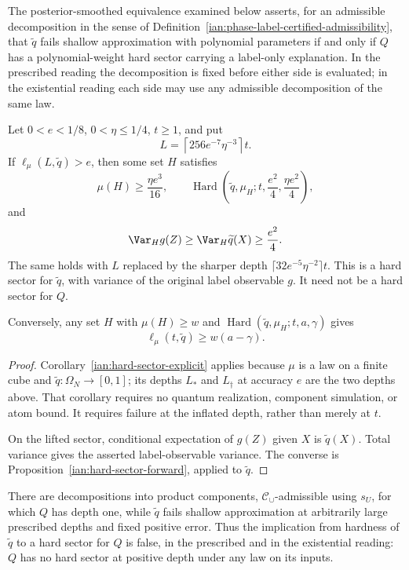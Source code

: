 The posterior-smoothed equivalence examined below asserts, for an admissible decomposition in the sense of Definition~\ref{ian:phase-label-certified-admissibility}, that \(\widetilde q\) fails shallow approximation with polynomial parameters if and only if \(Q\) has a polynomial-weight hard sector carrying a label-only explanation. In the prescribed reading the decomposition is fixed before either side is evaluated; in the existential reading each side may use any admissible decomposition of the same law.

\begin{theorem}
\label{ian:phase-label-posterior-extraction}
Let \(0<e<1/8\), \(0<\eta\le1/4\), \(t\ge1\), and put
\[
 L=\left\lceil256e^{-7}\eta^{-3}\right\rceil t.
\]
If \(\ell_\mu(L,\widetilde q)>e\), then some set \(H\) satisfies
\[
 \mu(H)\ge\frac{\eta e^3}{16},\qquad
 \operatorname{Hard}
 \left(\widetilde q,\mu_H;
       t,\frac{e^2}{4},\frac{\eta e^2}{4}\right),
\]
and
\[
 \Var_H g(Z)\ge\Var_H\widetilde q(X)\ge\frac{e^2}{4}.
\]
The same holds with \(L\) replaced by the sharper depth
\(\lceil32e^{-5}\eta^{-2}\rceil t\). This is a hard sector for \(\widetilde q\), with variance of the original label observable \(g\). It need not be a hard sector for \(Q\).

Conversely, any set \(H\) with \(\mu(H)\ge w\) and
\(\operatorname{Hard}(\widetilde q,\mu_H;t,a,\gamma)\) gives
\[
 \ell_\mu(t,\widetilde q)\ge w(a-\gamma).
\]
\end{theorem}

\begin{proof}
Corollary~\ref{ian:hard-sector-explicit} applies because \(\mu\) is a law on a finite cube and \(\widetilde q:\Omega_N\to[0,1]\); its depths \(L_*\) and \(L_\dagger\) at accuracy \(e\) are the two depths above. That corollary requires no quantum realization, component simulation, or atom bound. It requires failure at the inflated depth, rather than merely at \(t\).

On the lifted sector, conditional expectation of \(g(Z)\) given \(X\) is \(\widetilde q(X)\). Total variance gives the asserted label-observable variance. The converse is Proposition~\ref{ian:hard-sector-forward}, applied to \(\widetilde q\).
\end{proof}

\begin{proposition}
\label{ian:phase-label-posterior-hard-shallow-acceptance}
There are decompositions into product components, \(\mathcal C_\cup\)-admissible using \(s_U\), for which \(Q\) has depth one, while \(\widetilde q\) fails shallow approximation at arbitrarily large prescribed depths and fixed positive error. Thus the implication from hardness of \(\widetilde q\) to a hard sector for \(Q\) is false, in the prescribed and in the existential reading: \(Q\) has no hard sector at positive depth under any law on its inputs.
\end{proposition}

